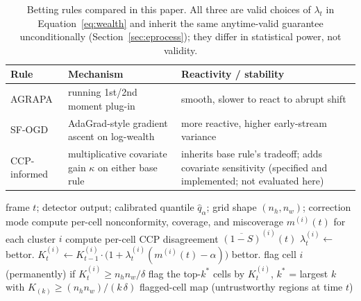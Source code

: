 \begin{table}[t]
\centering
\caption{Betting rules compared in this paper. All three are valid choices of $\lambda_t$ in Equation~\ref{eq:wealth} and inherit the same anytime-valid guarantee unconditionally (Section~\ref{sec:eprocess}); they differ in statistical power, not validity.}
\label{tab:betting-comparison}
\begin{threeparttable}
\begin{tabular}{@{}p{1.8cm}p{4.4cm}p{4.6cm}@{}}
\toprule
Rule & Mechanism & Reactivity / stability \\
\midrule
AGRAPA & running 1st/2nd moment plug-in & smooth, slower to react to abrupt shift \\
SF-OGD & AdaGrad-style gradient ascent on log-wealth & more reactive, higher early-stream variance \\
CCP-informed & multiplicative covariate gain $\kappa$ on either base rule & inherits base rule's tradeoff; adds covariate sensitivity (specified and implemented; not evaluated here) \\
\bottomrule
\end{tabular}
\end{threeparttable}
\end{table}

\begin{algorithm}[t]
\caption{Per-frame spatial monitoring update}
\label{alg:spatial-monitor}
\footnotesize
\begin{algorithmic}[1]
\Require frame $t$; detector output; calibrated quantile $\hat{q}_\alpha$; grid shape $(n_h, n_w)$; correction mode
\State compute per-cell nonconformity, coverage, and miscoverage $m^{(i)}(t)$ for each cluster $i$
\State compute per-cell CCP disagreement $\overline{(1-S)}^{(i)}(t)$
    \State $\lambda_t^{(i)} \gets$ bettor.
    \State $K_t^{(i)} \gets K_{t-1}^{(i)} \cdot \big(1 + \lambda_t^{(i)}(m^{(i)}(t) - \alpha)\big)$
    \State bettor.
\EndFor
{}
    \State flag cell $i$ (permanently) if $K_t^{(i)} \ge n_h n_w / \delta$
\Else {}
    \State flag the top-$k^\ast$ cells by $K_t^{(i)}$, $k^\ast$ = largest $k$ with $K_{(k)} \ge (n_h n_w) / (k\,\delta)$
\EndIf
\State \Return flagged-cell map (untrustworthy regions at time $t$)
\end{algorithmic}
\end{algorithm}

